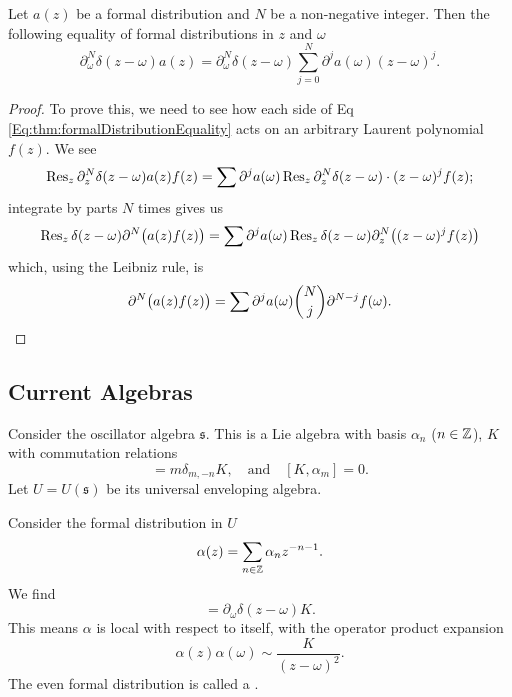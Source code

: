 \begin{thm}
Let $a(z)$ be a formal distribution and $N$ be a non-negative
integer. Then the following equality of formal distributions in $z$ and
$\omega$ 
\begin{equation}\label{Eq:thm:formalDistributionEquality}
\partial_{\omega}^{N}\delta(z-\omega)a(z)=\partial_{\omega}^{N}\delta(z-\omega)\sum^{N}_{j=0}\partial^{j}a(\omega)(z-\omega)^{j}.
\end{equation}
\end{thm}
\begin{proof}
To prove this, we need to see how each side of
Eq \eqref{Eq:thm:formalDistributionEquality} acts on an arbitrary
Laurent polynomial $f(z)$.
We see
\begin{equation}
\Res[z]{\partial_{z}^{N}\delta(z-\omega)a(z)f(z)}=\sum\partial^{j}a(\omega)\Res[z]{\partial_{z}^{N}\delta(z-\omega)\cdot(z-\omega)^{j}f(z)};
\end{equation}
integrate by parts $N$ times gives us
\begin{equation}
\Res[z]{\delta(z-\omega)\partial^{N}\bigl(a(z)f(z)\bigr)}
=\sum\partial^{j}a(\omega)\Res[z]{\delta(z-\omega)\partial_{z}^{N}\bigl((z-\omega)^{j}f(z)\bigr)}
\end{equation}
which, using the Leibniz rule, is
\begin{equation*}
\partial^{N}\bigl(a(z)f(z)\bigr)=\sum\partial^{j}a(\omega){N\choose j}\partial^{N-j}f(\omega).\qedhere
\end{equation*}
\end{proof}

\subsection{Current Algebras}
\M
Consider the oscillator algebra $\mathfrak{s}$. This is a Lie algebra
with basis $\alpha_n$ ($n\in\ZZ$), $K$ with commutation relations
\begin{equation}
[\alpha_m,\alpha_n]=m\delta_{m,-n}K,\quad\mbox{and}\quad
[K,\alpha_m]=0.
\end{equation}
Let $U=U(\mathfrak{s})$ be its universal enveloping algebra.

\M
Consider the formal distribution in $U$
\begin{equation}
\alpha(z)=\sum_{n\in\ZZ}\alpha_nz^{-n-1}.
\end{equation}
We find
\begin{equation}
[\alpha(z),\alpha(\omega)]=\partial_{\omega}\delta(z-\omega)K.
\end{equation}
This means $\alpha$ is local with respect to itself, with the operator
product expansion
\begin{equation}
\alpha(z)\alpha(\omega)\sim\frac{K}{(z-\omega)^{2}}.
\end{equation}
The even formal distribution is called a .

